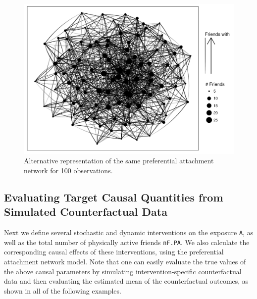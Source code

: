 \documentclass[english]{article}\usepackage[]{graphicx}\usepackage[]{color}
\makeatletter
\def\maxwidth{ %
  \ifdim\Gin@nat@width>\linewidth
    \linewidth
  \else
    \Gin@nat@width
  \fi
}
\newenvironment{knitrout}{}{} %
\theoremstyle{plain}
\theoremstyle{plain}
\makeatother
\begin{document}
\begin{knitrout}\footnotesize
{}\color{fgcolor}\begin{figure}[ht]

{\centering \includegraphics[width=\maxwidth]{TablesFigs/knitR-unnamed-chunk-14-1} 

}

\caption{Alternative representation of the same preferential attachment network for 100 observations.\label{fig:netExamplePA2.bw}}\label{fig:unnamed-chunk-14}
\end{figure}


\end{knitrout}

\subsection{Evaluating Target Causal Quantities from Simulated Counterfactual Data}

Next we define several stochastic and dynamic interventions on the exposure \texttt{A}, as well as the total number of physically active friends \texttt{nF.PA}. We also calculate the corresponding causal effects of these interventions, using the preferential attachment network model. Note that one can easily evaluate the true values of the above causal parameters by simulating intervention-specific counterfactual data and then evaluating the estimated mean of the counterfactual outcomes, as shown in all of the following examples.
\end{document}
